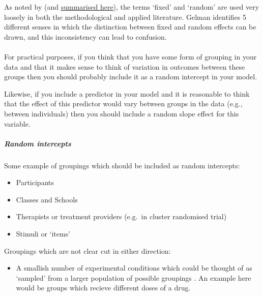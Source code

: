 \documentclass[]{article}
\providecommand{\tightlist}{%
  \setlength{\itemsep}{0pt}\setlength{\parskip}{0pt}}
\let\oldparagraph\paragraph
\renewcommand{\paragraph}[1]{\oldparagraph{#1}\mbox{}}
\let\oldsubparagraph\subparagraph
\renewcommand{\subparagraph}[1]{\oldsubparagraph{#1}\mbox{}}
\theoremstyle{definition}
\theoremstyle{definition}
\theoremstyle{definition}
\theoremstyle{remark}
\begin{document}
As noted by \citet{gelman2005analysis} (and
\href{http://andrewgelman.com/2005/01/25/why_i_dont_use/}{summarised
here}), the terms `fixed' and `random' are used very loosely in both the
methodological and applied literature. Gelman identifies 5 different
senses in which the distinction between fixed and random effects can be
drawn, and this inconsistency can lead to confusion.

\hypertarget{random-slopes-intercepts}{\paragraph{}\label{random-slopes-intercepts}}

For practical purposes, if you think that you have some form of grouping
in your data and that it makes sense to think of variation in outcomes
between these groups then you should probably include it as a random
intercept in your model.

Likewise, if you include a predictor in your model and it is reasonable
to think that the effect of this predictor would vary between groups in
the data (e.g., between individuals) then you should include a random
slope effect for this variable.

\hypertarget{random-intercepts}{\subparagraph{Random
intercepts}\label{random-intercepts}}

Some example of groupings which should be included as random intercepts:

\begin{itemize}
\tightlist
\item
  Participants
\item
  Classes and Schools
\item
  Therapists or treatment providers (e.g.~in cluster randomised trial)
\item
  Stimuli or `items'
\end{itemize}

Groupings which are not clear cut in either direction:

\begin{itemize}
\tightlist
\item
  A smallish number of experimental conditions which could be thought of
  as `sampled' from a larger population of possible groupings
  \citep{gelman2005analysis}. An example here would be groups which
  recieve different doses of a drug.
\end{itemize}
\end{document}
